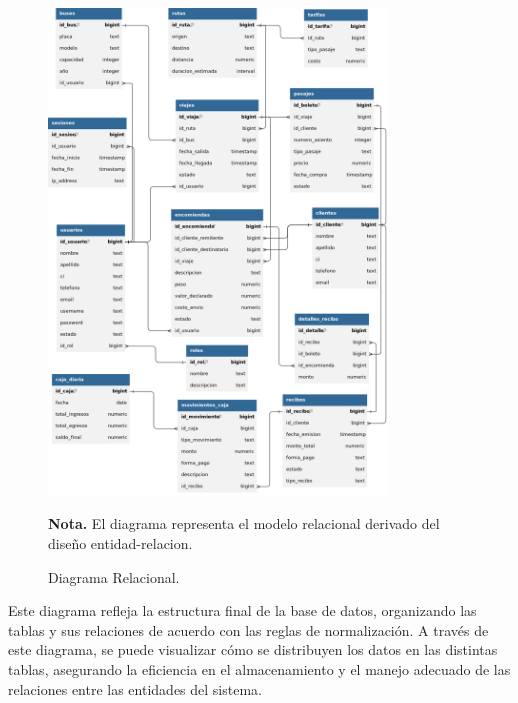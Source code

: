 	\begin{figure}[!h] %
		\caption[Diagrama Relacional]
		{\newline Diagrama Relacional.} %
		\centering
		\includegraphics[width=0.8\textwidth]{imagenes/cap_3/modelo_relacional.png} %
		
		\begin{flushleft}
			\hspace{1.20cm} \textbf{Nota.} El diagrama representa el modelo relacional derivado del diseño entidad-relacion. %
		\end{flushleft}
		\vspace{-16pt}
		\label{fig:diag_rela} %
	\end{figure}
	
	Este diagrama refleja la estructura final de la base de datos, organizando las tablas y sus relaciones de acuerdo con las reglas de normalización. A través de este diagrama, se puede visualizar cómo se distribuyen los datos en las distintas tablas, asegurando la eficiencia en el almacenamiento y el manejo adecuado de las relaciones entre las entidades del sistema.
	
